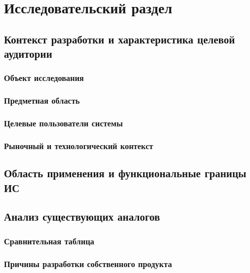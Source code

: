 \chapter{Исследовательский раздел}

\section{Контекст разработки и характеристика целевой аудитории}

\subsection{Объект исследования}

\lipsum[1][1-6]

\subsection{Предметная область}

\lipsum[2-3]

\subsection{Целевые пользователи системы}

\lipsum[4-5]

\subsection{Рыночный и технологический контекст}

\lipsum[6-7]

\section{Область применения и функциональные границы ИС}

\section{Анализ существующих аналогов}

\subsection{Сравнительная таблица}

\subsection{Причины разработки собственного продукта}

